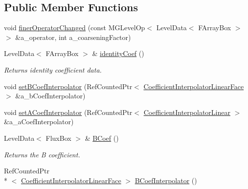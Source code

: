 \subsection*{Public Member Functions}
\begin{DoxyCompactItemize}
\item 
void \hyperlink{class_a_m_r_non_linear_multi_comp_op_ad5c79a27d60fc17c24eea9c052aa84ac}{finer\-Operator\-Changed} (const M\-G\-Level\-Op$<$ Level\-Data$<$ F\-Array\-Box $>$ $>$ \&a\-\_\-operator, int a\-\_\-coarsening\-Factor)
\item 
\hypertarget{class_a_m_r_non_linear_multi_comp_op_a639364f5cf0da9ec0237241639ae8404}{Level\-Data$<$ F\-Array\-Box $>$ \& \hyperlink{class_a_m_r_non_linear_multi_comp_op_a639364f5cf0da9ec0237241639ae8404}{identity\-Coef} ()}\label{class_a_m_r_non_linear_multi_comp_op_a639364f5cf0da9ec0237241639ae8404}

\begin{DoxyCompactList}\small\item\em Returns identity coefficient data. \end{DoxyCompactList}\item 
void \hyperlink{class_a_m_r_non_linear_multi_comp_op_a64125ca23b133e2ca86437d7b8cfad3c}{set\-B\-Coef\-Interpolator} (Ref\-Counted\-Ptr$<$ \hyperlink{class_coefficient_interpolator_linear_face}{Coefficient\-Interpolator\-Linear\-Face} $>$ \&a\-\_\-b\-Coef\-Interpolator)
\item 
void \hyperlink{class_a_m_r_non_linear_multi_comp_op_afbc2843a557aa21ae1e88372dae80f9b}{set\-A\-Coef\-Interpolator} (Ref\-Counted\-Ptr$<$ \hyperlink{class_coefficient_interpolator_linear}{Coefficient\-Interpolator\-Linear} $>$ \&a\-\_\-a\-Coef\-Interpolator)
\item 
\hypertarget{class_a_m_r_non_linear_multi_comp_op_a58e58cbf6a60f356392931aaf4d6c268}{Level\-Data$<$ Flux\-Box $>$ \& \hyperlink{class_a_m_r_non_linear_multi_comp_op_a58e58cbf6a60f356392931aaf4d6c268}{B\-Coef} ()}\label{class_a_m_r_non_linear_multi_comp_op_a58e58cbf6a60f356392931aaf4d6c268}

\begin{DoxyCompactList}\small\item\em Returns the B coefficient. \end{DoxyCompactList}\item 
\hypertarget{class_a_m_r_non_linear_multi_comp_op_a15f72d25367f2a9a8c8a5211357947d0}{Ref\-Counted\-Ptr\\*
$<$ \hyperlink{class_coefficient_interpolator_linear_face}{Coefficient\-Interpolator\-Linear\-Face} $>$ \hyperlink{class_a_m_r_non_linear_multi_comp_op_a15f72d25367f2a9a8c8a5211357947d0}{B\-Coef\-Interpolator} ()}\label{class_a_m_r_non_linear_multi_comp_op_a15f72d25367f2a9a8c8a5211357947d0}


\end{DoxyCompactItemize}
